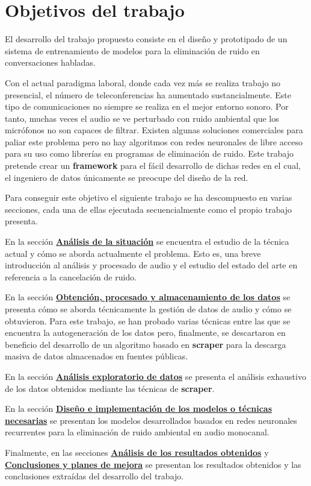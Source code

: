\chapter{Objetivos del trabajo}
El desarrollo del trabajo propuesto consiste en el diseño y prototipado de un sistema de entrenamiento de modelos para la eliminación de ruido en conversaciones habladas.

Con el actual paradigma laboral, donde cada vez más se realiza trabajo no presencial, el número de teleconferencias ha aumentado sustancialmente. Este tipo de comunicaciones no siempre se realiza en el mejor entorno sonoro. Por tanto, muchas veces el audio se ve perturbado con ruido ambiental que los micrófonos no son capaces de filtrar. Existen algunas soluciones comerciales para paliar este problema pero no hay algoritmos con redes neuronales de libre acceso para su uso como librerías en programas de eliminación de ruido. Este trabajo pretende crear un \textbf{\gls{framework}} para el fácil desarrollo de dichas redes en el cual, el ingeniero de datos únicamente se preocupe del diseño de la red.

Para conseguir este objetivo el siguiente trabajo se ha descompuesto en varias secciones, cada una de ellas ejecutada secuencialmente como el propio trabajo presenta.

En la sección \hyperref[cp: situationalAnalysis]{\textbf{Análisis de la situación}} se encuentra el estudio de la técnica actual y cómo se aborda actualmente el problema. Esto es, una breve introducción al análisis y procesado de audio y el estudio del estado del arte en referencia a la cancelación de ruido.

En la sección \hyperref[cp: dataGathering]{\textbf{Obtención, procesado y almacenamiento de los datos}} se presenta cómo se aborda técnicamente la gestión de datos de audio y cómo se obtuvieron. Para este trabajo, se han probado varias técnicas entre las que se encuentra la autogeneración de los datos pero, finalmente, se descartaron en beneficio del desarrollo de un algoritmo basado en \textbf{\gls{scraper}} para la descarga masiva de datos almacenados en fuentes públicas.

En la sección \hyperref[cp: eda]{\textbf{Análisis exploratorio de datos}} se presenta el análisis exhaustivo de los datos obtenidos mediante las técnicas de \textbf{\gls{scraper}}.

En la sección \hyperref[cp: eda]{\textbf{Diseño e implementación de los modelos o técnicas necesarias}} se presentan los modelos desarrollados basados en redes neuronales recurrentes para la eliminación de ruido ambiental en audio monocanal.

Finalmente, en las secciones \hyperref[cp: results]{\textbf{Análisis de los resultados obtenidos}} y \hyperref[cp: conclusions]{\textbf{Conclusiones y planes de mejora}} se presentan los resultados obtenidos y las conclusiones extraídas del desarrollo del trabajo.



